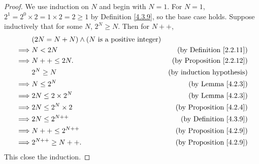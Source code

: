 \begin{proof}
    We use induction on \(N\) and begin with \(N = 1\).
    For \(N = 1\), \(2^1 = 2^0 \times 2 = 1 \times 2 = 2 \geq 1\) by Definition \ref{4.3.9}, so the base case holds.
    Suppose inductively that for some \(N\), \(2^N \geq N\).
    Then for \(N++\),
    \begin{align*}
                 & (2N = N + N) \land (N \text{ is a positive integer})                                        \\
        \implies & N < 2N                                               & \text{(by Definition \ref{2.2.11})}  \\
        \implies & N++ \leq 2N.                                         & \text{(by Proposition \ref{2.2.12})} \\
                 & 2^N \geq N                                           & \text{(by induction hypothesis)}     \\
        \implies & N \leq 2^N                                           & \text{(by Lemma \ref{4.2.3})}        \\
        \implies & 2N \leq 2 \times 2^N                                 & \text{(by Lemma \ref{4.2.3})}        \\
        \implies & 2N \leq 2^N \times 2                                 & \text{(by Proposition \ref{4.2.4})}  \\
        \implies & 2N \leq 2^{N++}                                      & \text{(by Definition \ref{4.3.9})}   \\
        \implies & N++ \leq 2^{N++}                                     & \text{(by Proposition \ref{4.2.9})}  \\
        \implies & 2^{N++} \geq N++.                                    & \text{(by Proposition \ref{4.2.9})}
    \end{align*}
    This close the induction.
\end{proof}